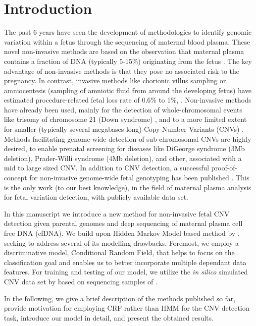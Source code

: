 \section{Introduction}

The past 6 years have seen the development of methodologies to identify genomic variation within a fetus through the sequencing of maternal blood plasma. These novel non-invasive methods are based on the observation that maternal plasma contains a fraction of DNA (typically 5-15\%) originating from the fetus \citep{lo1997presence}. The key advantage of non-invasive methods is that they pose no associated risk to the pregnancy. In contrast, invasive methods like chorionic villus sampling or amniocentesis (sampling of amniotic fluid from around the developing fetus) have estimated procedure-related fetal loss rate of 0.6\% to 1\%, \cite{douglas2007amnio}. Non-invasive methods have already been used, mainly for the detection of whole-chromosomal events like trisomy of chromosome 21 (Down syndrome) \citep{chiu2008noninvasive, fan2008noninvasive}, and to a more limited extent for smaller (typically several megabases long) Copy Number Variants (CNVs) \citep{chen2013, srinivasan2013, rampasek2014fcnv}. Methods facilitating genome-wide detection of sub-chromosomal CNVs are highly desired, to enable prenatal screening for diseases like DiGeorge syndrome (\ntilde3Mb deletion), Prader-Willi syndrome (\ntilde4Mb deletion), and other, associated with a mid to large sized CNV. In addition to CNV detection, a successful proof-of-concept for non-invasive genome-wide fetal genotyping has been published \citep{kitzman2012}. This is the only work (to our best knowledge), in the field of maternal plasma analysis for fetal variation detection, with publicly available data set.

In this manuscript we introduce a new method for non-invasive fetal CNV detection given parental genomes and deep sequencing of maternal plasma cell free DNA (cfDNA). We build upon Hidden Markov Model based method by \cite{rampasek2014fcnv}, seeking to address several of its modelling drawbacks. Foremost, we employ a discriminative model, Conditional Random Field, that helps to focus on the classification goal and enables us to better incorporate multiple dependant data features. For training and testing of our model, we utilize the \textit{in silico} simulated CNV data set by \cite{rampasek2014fcnv} based on sequencing samples of \cite{kitzman2012}.

In the following, we give a brief description of the methods published so far, provide motivation for employing CRF rather than HMM for the CNV detection task, introduce our model in detail, and present the obtained results.

